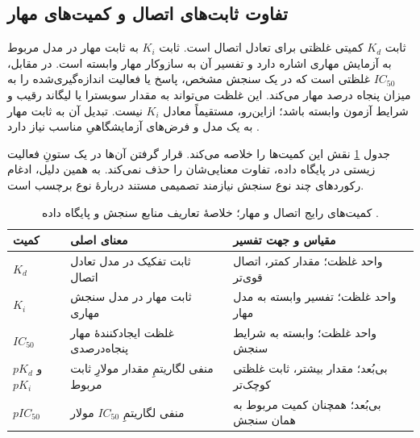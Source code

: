 \subsection{تفاوت ثابت‌های اتصال و کمیت‌های مهار}
\label{sec:label-semantics}
ثابت $K_d$ کمیتی غلظتی برای تعادل اتصال است. ثابت $K_i$ به ثابت مهار در مدل مربوط به آزمایش مهاری اشاره دارد و تفسیر آن به سازوکار مهار وابسته است. در مقابل، $IC_{50}$ غلظتی است که در یک سنجش مشخص، پاسخ یا فعالیت اندازه‌گیری‌شده را به میزان پنجاه درصد مهار می‌کند. این غلظت می‌تواند به مقدار سوبسترا یا لیگاند رقیب و شرایط آزمون وابسته باشد؛ ازاین‌رو، مستقیماً معادل $K_i$ نیست. تبدیل آن به ثابت مهار به یک مدل و فرض‌های آزمایشگاهیِ مناسب نیاز دارد \cite{Hulme10BindingAssays,Campbell12AssayData}.

جدول \ref{tab:affinity-quantities} نقش این کمیت‌ها را خلاصه می‌کند. قرار گرفتن آن‌ها در یک ستونِ فعالیت زیستی در پایگاه داده، تفاوت معنایی‌شان را حذف نمی‌کند. به همین دلیل، ادغام رکوردهای چند نوع سنجش نیازمند تصمیمی مستند دربارهٔ نوع برچسب است.

\begin{table}[!htbp]
\centering
\caption{کمیت‌های رایج اتصال و مهار؛ خلاصهٔ تعاریف منابع سنجش و پایگاه داده \cite{Hulme10BindingAssays,Campbell12AssayData,Bento14ChEMBL}.}
\label{tab:affinity-quantities}
\small
\begin{tabular}{|p{1.6cm}|p{6.5cm}|p{4.2cm}|}
\hline
کمیت & معنای اصلی & مقیاس و جهت تفسیر \\ \hline
$K_d$ & ثابت تفکیک در مدل تعادل اتصال & واحد غلظت؛ مقدار کمتر، اتصال قوی‌تر \\ \hline
$K_i$ & ثابت مهار در مدل سنجش مهاری & واحد غلظت؛ تفسیر وابسته به مدل مهار \\ \hline
$IC_{50}$ & غلظت ایجادکنندهٔ مهار پنجاه‌درصدی & واحد غلظت؛ وابسته به شرایط سنجش \\ \hline
$pK_d$ و $pK_i$ & منفی لگاریتمِ مقدار مولارِ ثابت مربوط & بی‌بُعد؛ مقدار بیشتر، ثابت غلظتی کوچک‌تر \\ \hline
$pIC_{50}$ & منفی لگاریتمِ $IC_{50}$ مولار & بی‌بُعد؛ همچنان کمیت مربوط به همان سنجش \\ \hline
\end{tabular}
\end{table}

